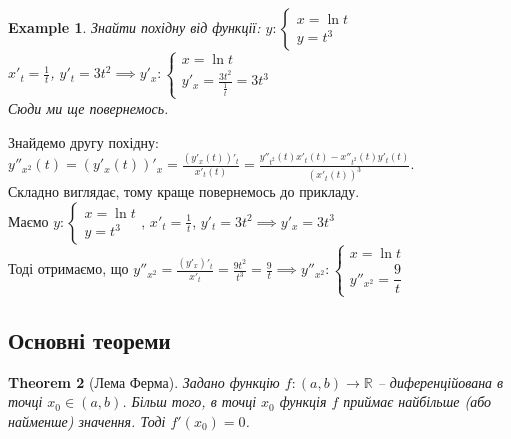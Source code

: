 \documentclass[a4paper, 14pt]{article}
\theoremstyle{theoremdd}
\newtheorem{theorem}{Theorem}[subsection]
\theoremstyle{theoremdd}
\theoremstyle{theoremdd}
\theoremstyle{theoremdd}
\newtheorem{example}[theorem]{Example}
\theoremstyle{theoremdd}
\theoremstyle{theoremdd}
\theoremstyle{theoremdd}
\theoremstyle{theoremdd}
\begin{document}
\begin{example}
Знайти похідну від функції: $y: \begin{cases} x = \ln t \\ y = t^3 \end{cases}$\\
$x'_t = \displaystyle \frac{1}{t}$,    $y'_t = 3t^2 \implies \displaystyle  y'_x: \begin{cases} x = \ln t \\ y'_x = \displaystyle \frac{3t^2}{\frac{1}{t}} = 3t^3 \end{cases}$\\
Сюди ми ще повернемось.
\end{example}

Знайдемо другу похідну:\\
$\displaystyle y''_{x^2}(t) = (y'_x(t))'_x = \frac{(y'_x(t))'_t}{x'_t(t)} = \frac{y''_{t^2}(t)x'_t(t)-x''_{t^2}(t)y'_t(t)}{(x'_t(t))^3}$.
\bigskip \\
Складно виглядає, тому краще повернемось до прикладу.\\
Маємо $y: \begin{cases} x = \ln t \\ y = t^3 \end{cases}$, \qquad $x'_t = \displaystyle \frac{1}{t}$,    $y'_t = 3t^2 \implies y'_x = 3t^3$\\
Тоді отримаємо, що $y''_{x^2} = \displaystyle \frac{(y'_x)'_t}{x'_t} = \frac{9t^2}{t^3} = \frac{9}{t} \implies y''_{x^2}: \begin{cases} x = \ln t \\ y''_{x^2} = \dfrac{9}{t} \end{cases}$

\subsection{Основні теореми}
\begin{theorem}[Лема Ферма]
Задано функцію $f \colon (a,b) \to \mathbb{R}$ -- диференційована в точці $x_0 \in (a,b)$. Більш того, в точці $x_0$ функція $f$ приймає найбільше (або найменше) значення. Тоді $f'(x_0)=0$.
\end{theorem}
\end{document}

